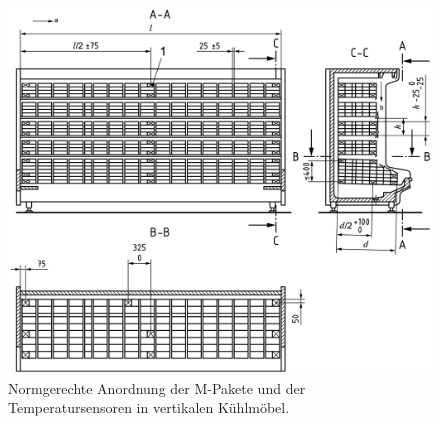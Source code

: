 \begin{figure}[h!tb]
\centering
\includegraphics[scale=.12]{Pictures/multi-deck-chilled-cabinet.pdf}
\caption{Normgerechte Anordnung der M-Pakete und der Temperatursensoren in vertikalen Kühlmöbel.}
\label{fig:Anordnung der M-Pakete}
\end{figure}

